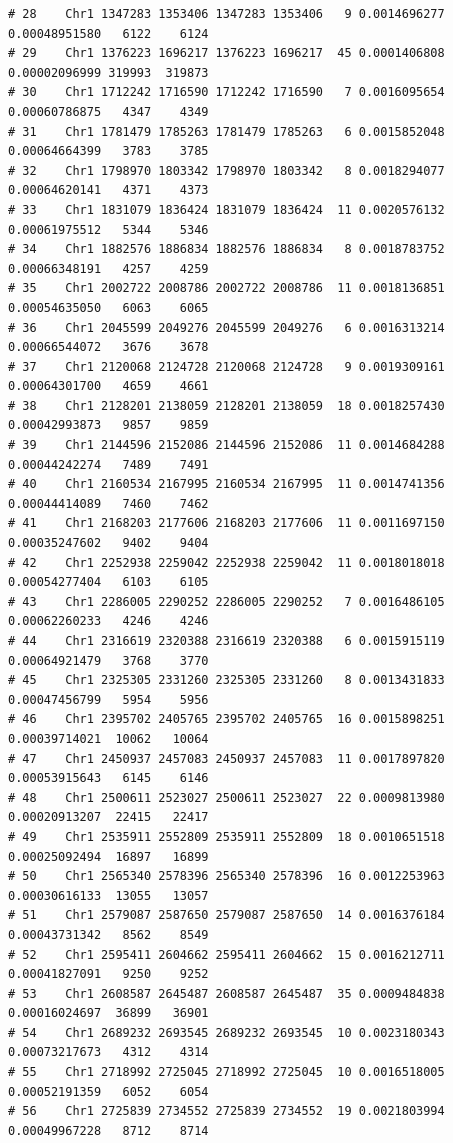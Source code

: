 \documentclass{article}\usepackage[]{graphicx}\usepackage[]{color}
\makeatletter
\newenvironment{kframe}{%
 \def\at@end@of@kframe{}%
 \ifinner\ifhmode%
  \def\at@end@of@kframe{\end{minipage}}%
  \begin{minipage}{\columnwidth}%
 \fi\fi%
 \def\FrameCommand##1{\hskip\@totalleftmargin \hskip-\fboxsep
 \colorbox{shadecolor}{##1}\hskip-\fboxsep
     \hskip-\linewidth \hskip-\@totalleftmargin \hskip\columnwidth}%
 \MakeFramed {\advance\hsize-\width
   \@totalleftmargin\z@ \linewidth\hsize
   \@setminipage}}%
 {\par\unskip\endMakeFramed%
 \at@end@of@kframe}
\newenvironment{knitrout}{}{} %
\makeatother
\begin{document}
\begin{knitrout}
\begin{kframe}
\begin{verbatim}
# 28    Chr1 1347283 1353406 1347283 1353406   9 0.0014696277 0.00048951580   6122    6124
# 29    Chr1 1376223 1696217 1376223 1696217  45 0.0001406808 0.00002096999 319993  319873
# 30    Chr1 1712242 1716590 1712242 1716590   7 0.0016095654 0.00060786875   4347    4349
# 31    Chr1 1781479 1785263 1781479 1785263   6 0.0015852048 0.00064664399   3783    3785
# 32    Chr1 1798970 1803342 1798970 1803342   8 0.0018294077 0.00064620141   4371    4373
# 33    Chr1 1831079 1836424 1831079 1836424  11 0.0020576132 0.00061975512   5344    5346
# 34    Chr1 1882576 1886834 1882576 1886834   8 0.0018783752 0.00066348191   4257    4259
# 35    Chr1 2002722 2008786 2002722 2008786  11 0.0018136851 0.00054635050   6063    6065
# 36    Chr1 2045599 2049276 2045599 2049276   6 0.0016313214 0.00066544072   3676    3678
# 37    Chr1 2120068 2124728 2120068 2124728   9 0.0019309161 0.00064301700   4659    4661
# 38    Chr1 2128201 2138059 2128201 2138059  18 0.0018257430 0.00042993873   9857    9859
# 39    Chr1 2144596 2152086 2144596 2152086  11 0.0014684288 0.00044242274   7489    7491
# 40    Chr1 2160534 2167995 2160534 2167995  11 0.0014741356 0.00044414089   7460    7462
# 41    Chr1 2168203 2177606 2168203 2177606  11 0.0011697150 0.00035247602   9402    9404
# 42    Chr1 2252938 2259042 2252938 2259042  11 0.0018018018 0.00054277404   6103    6105
# 43    Chr1 2286005 2290252 2286005 2290252   7 0.0016486105 0.00062260233   4246    4246
# 44    Chr1 2316619 2320388 2316619 2320388   6 0.0015915119 0.00064921479   3768    3770
# 45    Chr1 2325305 2331260 2325305 2331260   8 0.0013431833 0.00047456799   5954    5956
# 46    Chr1 2395702 2405765 2395702 2405765  16 0.0015898251 0.00039714021  10062   10064
# 47    Chr1 2450937 2457083 2450937 2457083  11 0.0017897820 0.00053915643   6145    6146
# 48    Chr1 2500611 2523027 2500611 2523027  22 0.0009813980 0.00020913207  22415   22417
# 49    Chr1 2535911 2552809 2535911 2552809  18 0.0010651518 0.00025092494  16897   16899
# 50    Chr1 2565340 2578396 2565340 2578396  16 0.0012253963 0.00030616133  13055   13057
# 51    Chr1 2579087 2587650 2579087 2587650  14 0.0016376184 0.00043731342   8562    8549
# 52    Chr1 2595411 2604662 2595411 2604662  15 0.0016212711 0.00041827091   9250    9252
# 53    Chr1 2608587 2645487 2608587 2645487  35 0.0009484838 0.00016024697  36899   36901
# 54    Chr1 2689232 2693545 2689232 2693545  10 0.0023180343 0.00073217673   4312    4314
# 55    Chr1 2718992 2725045 2718992 2725045  10 0.0016518005 0.00052191359   6052    6054
# 56    Chr1 2725839 2734552 2725839 2734552  19 0.0021803994 0.00049967228   8712    8714

\end{verbatim}
\end{kframe}
\end{knitrout}
\end{document}
